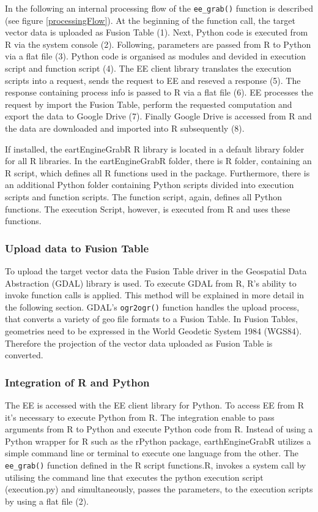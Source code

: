 In the following an internal processing flow of the \texttt{ee\_grab()} function is described (see figure \ref{processingFlow}).
At the beginning of the function call, the target vector data is uploaded as Fusion Table (1). Next, Python code is executed from R via the system console (2). 
Following, parameters are passed from R to Python via a flat file (3). Python code is organised as modules and devided in execution script and function script (4). The EE client library translates the execution scripts into a request, sends the request to EE  and reseved a response (5). The response containing process info is passed to R via a flat file (6). EE processes the request by import the Fusion Table, perform the requested computation and export the data to Google Drive (7).
Finally Google Drive is accessed from R and the data are downloaded and imported into R subsequently (8).

If installed, the eartEngineGrabR R library is located in a default library folder for all R libraries. In the eartEngineGrabR folder, there is R folder, containing an R script, which defines all R functions used in the package. Furthermore, there is an additional Python folder containing Python scripts divided into execution scripts and function scripts. The function script, again, defines all Python functions. The execution Script, however, is executed from R and uses these functions.

\subsubsection{Upload data to Fusion Table}

To upload the target vector data the Fusion Table driver in the Geospatial Data Abstraction (GDAL) library is used. To execute GDAL from R, R's ability to invoke function calls is applied. This method will be explained in more detail in the following section. GDAL's \texttt{ogr2ogr()}  function handles the upload process, that converts a variety of geo file formats to a Fusion Table. In Fusion Tables, geometries need to be expressed in the World Geodetic System 1984 (WGS84). Therefore the projection of the vector data uploaded as Fusion Table is converted.

\subsubsection{Integration of R and Python}

The EE is accessed with the EE client library for Python. To access EE from R it's necessary to execute Python from R. The integration enable to pass arguments from R to Python and execute Python code from R. Instead of using a Python wrapper for R such as the rPython package, earthEngineGrabR utilizes a simple command line or terminal to execute one language from the other. The \texttt{ee\_grab()} function defined in the R script functions.R, invokes a system call by utilising the command line that executes the python execution script (execution.py) and simultaneously, passes the parameters, to the execution scripts by using a flat file (2). 

